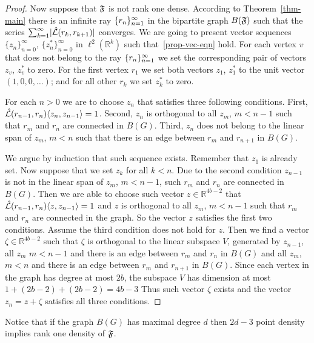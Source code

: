 \documentclass[12pt,oneside,a4paper]{amsart}
\begin{document}
\begin{proof}
        Now suppose that $\mathfrak{F}$ is not rank one dense.
        According to Theorem~\ref{thm-main} there is an infinite ray $\{{r}_n\}_{n=1}^\infty$ in the bipartite
          graph $B(\mathfrak{F})$ such that the series $\sum_{k=1}^\infty\lvert\hat{\mathcal{L}}(r_k, r_{k+1})\rvert$ converges.
        We are going to present vector sequences $\{z_n\}_{n=0}^\infty$, $\{z^*_n\}_{n=0}^\infty$ in $\ell^2 (\mathbb{R}^k)$
          such that~\eqref{prop-vec-eqn} hold.
        For each vertex $v$ that does not belong to the ray $\{{r}_n\}_{n=1}^\infty$ we set the corresponding pair of vectors $z_v$, $z^*_v$ to zero.
        For the first vertex $r_1$ we set both vectors $z_1$, $z^*_1$ to the unit vector $(1, 0, 0, \dots)$;
          and for all other $r_k$ we set $z^*_k$ to zero.

        For each $n > 0$ we are to choose $z_n$ that satisfies three following conditions.
        First, $\hat{\mathcal{L}}(r_{n-1}, r_n)\langle z_n, z_{n - 1} \rangle = 1$.
        Second, $z_n$ is orthogonal to all $z_m$, $m < n - 1$ such that $r_m$ and $r_{n}$ are connected in $B(G)$.
        Third, $z_n$ does not belong to the linear span of $z_m$, $m < n$ such that there is an edge between $r_m$ and $r_{n + 1}$ in $B(G)$.

        We argue by induction that such sequence exists.
        Remember that $z_1$ is already set.
        Now suppose that we set $z_k$ for all $k < n$.
        Due to the second condition $z_{n - 1}$ is not in the linear span of $z_m$, $m < n - 1$, such $r_m$ and $r_n$ are connected in $B(G)$.
        Then we are able to choose such vector $z \in \mathbb{R}^{4b - 2}$ that $\hat{\mathcal{L}}(r_{n-1}, r_n) \langle z, z_{n-1} \rangle = 1$ and
          $z$ is orthogonal to all $z_m$, $m < n - 1$ such that $r_m$ and $r_n$ are connected in the graph.
        So the vector $z$ satisfies the first two conditions.
        Assume the third condition does not hold for $z$.
        Then we find a vector $\zeta \in \mathbb{R}^{4b - 2}$ such that $\zeta$ is orthogonal to the linear subspace $V$, generated by
          $z_{n-1}$, all $z_m$ $m < n - 1$ and there is an edge between $r_m$ and $r_n$ in $B(G)$ and
          all $z_m$, $m < n$ and there is an edge between $r_m$ and $r_{n + 1}$ in $B(G)$.
        Since each vertex in the graph has degree at most $2b$, the subspace $V$ has dimension at most $1 + (2b - 2) + (2b - 2) = 4b - 3$
        Thus such vector $\zeta$ exists and the vector $z_n = z + \zeta$ satisfies all three conditions.
      \end{proof}
      \begin{remark}
        Notice that if the graph $B(G)$ has maximal degree $d$ then $2d - 3$ point density implies rank one density of $\mathfrak{F}$.
      \end{remark}
  \bigskip
\end{document}
